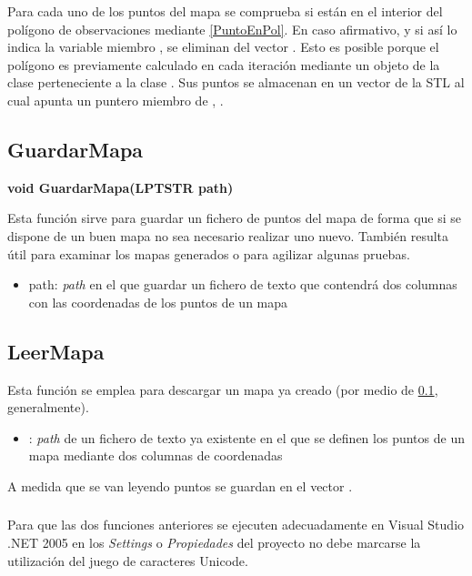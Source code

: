 Para cada uno de los puntos del mapa se comprueba si están en el interior del polígono de observaciones mediante \ref{PuntoEnPol}. En caso afirmativo, y si así lo indica la variable miembro , se eliminan del vector . Esto es posible porque el polígono es previamente calculado en cada iteración mediante un objeto de la clase  perteneciente a la clase . Sus puntos se almacenan en un vector de la STL al cual apunta un puntero miembro de , .

\subsection{GuardarMapa}\label{GuardarMapa}

\textbf{void GuardarMapa(LPTSTR path)}

Esta función sirve para guardar un fichero de puntos del mapa de forma que si se dispone de un buen mapa no sea necesario realizar uno nuevo. También resulta útil para examinar los mapas generados o para agilizar algunas pruebas.

\begin{itemize}
  \item path:  \emph{path} en el que guardar un fichero de texto que contendrá dos columnas con las coordenadas de los puntos de un mapa
\end{itemize}

\subsection{LeerMapa}


Esta función se emplea para descargar un mapa ya creado (por medio de \ref{GuardarMapa}, generalmente).

\begin{itemize}
  \item {}:  \emph{path} de un fichero de texto ya existente en el que se definen los puntos de un mapa mediante dos columnas de coordenadas
\end{itemize}

A medida que se van leyendo puntos se guardan en el vector .

\subsubsection{}
Para que las dos funciones anteriores se ejecuten adecuadamente en Visual Studio .NET 2005 en los \emph{Settings} o \emph{Propiedades} del proyecto no debe marcarse la utilización del juego de caracteres Unicode.

